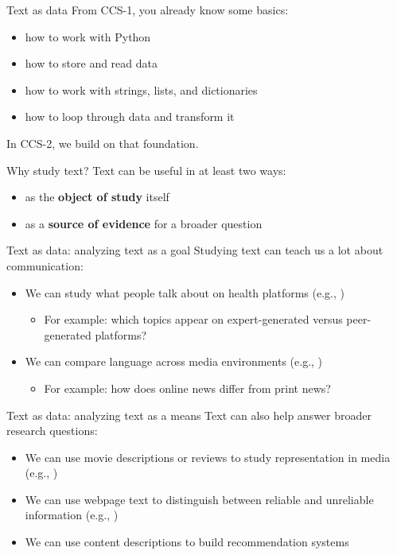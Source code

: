 \documentclass[handout]{beamer}
\begin{document}
\begin{frame}{Text as data}
From CCS-1, you already know some basics:
\begin{itemize}
	\item how to work with Python
	\item how to store and read data
	\item how to work with strings, lists, and dictionaries
	\item how to loop through data and transform it
\end{itemize}

\vspace{0.3cm}
In CCS-2, we build on that foundation.
\end{frame}

\begin{frame}{Why study text?}
Text can be useful in at least two ways:
\begin{itemize}
    \item as the \textbf{object of study} itself
    \item as a \textbf{source of evidence} for a broader question
\end{itemize}
\end{frame}

\begin{frame}{Text as data: analyzing text as a goal}
Studying text can teach us a lot about communication:
\begin{itemize}
    \item We can study what people talk about on health platforms (e.g., \cite{sanders_different_2020})
    \begin{itemize}
        \item For example: which topics appear on expert-generated versus peer-generated platforms?
    \end{itemize}
    \item We can compare language across media environments (e.g., \cite{burggraaff_through_2020})
    \begin{itemize}
        \item For example: how does online news differ from print news?
    \end{itemize}
\end{itemize}
\end{frame}

\begin{frame}{Text as data: analyzing text as a means}
Text can also help answer broader research questions:
\begin{itemize}
\item We can use movie descriptions or reviews to study representation in media (e.g., \cite{poma-murialdo_gender_2019})
\item We can use webpage text to distinguish between reliable and unreliable information (e.g., \cite{meppelink_reliable_2021})
\item We can use content descriptions to build recommendation systems
\end{itemize}
\end{frame}
\end{document}
